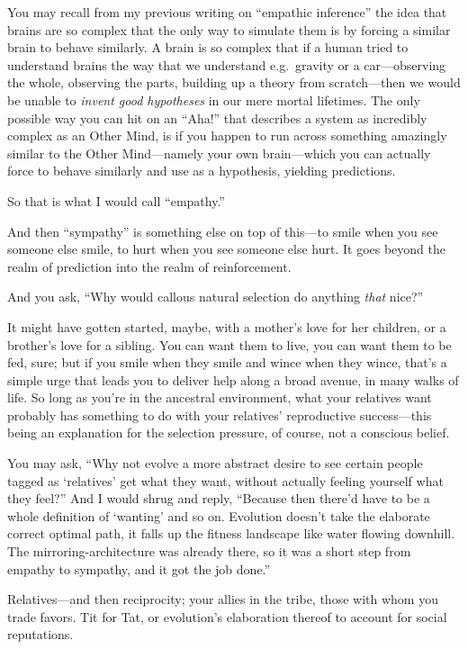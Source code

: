  You may recall from my previous writing on
``empathic inference'' the idea that
brains are so complex that the only way to simulate them is by forcing
a similar brain to behave similarly. A brain is so complex that if a
human tried to understand brains the way that we understand e.g.~gravity
or a car---observing the whole, observing the parts, building
up a theory from scratch---then we would be unable to \textit{invent
good hypotheses} in our mere mortal lifetimes. The only possible way
you can hit on an ``Aha!'' that
describes a system as incredibly complex as an Other Mind, is if you
happen to run across something amazingly similar to the Other
Mind---namely your own brain---which you can actually force to behave
similarly and use as a hypothesis, yielding predictions.


 So that is what I would call
``empathy.''


 And then ``sympathy'' is
something else on top of this---to smile when you see someone else
smile, to hurt when you see someone else hurt. It goes beyond the realm
of prediction into the realm of reinforcement.


 And you ask, ``Why would callous natural
selection do anything \textit{that} nice?''


 It might have gotten started, maybe, with a
mother's love for her children, or a
brother's love for a sibling. You can want them to
live, you can want them to be fed, sure; but if you smile when they
smile and wince when they wince, that's a simple urge
that leads you to deliver help along a broad avenue, in many walks of
life. So long as you're in the ancestral environment,
what your relatives want probably has something to do with your
relatives' reproductive success---this being an
explanation for the selection pressure, of course, not a conscious
belief.


 You may ask, ``Why not evolve a more abstract
desire to see certain people tagged as
`relatives' get what they want, without
actually feeling yourself what they feel?'' And I
would shrug and reply, ``Because then
there'd have to be a whole definition of
`wanting' and so on. Evolution
doesn't take the elaborate correct optimal path, it
falls up the fitness landscape like water flowing downhill. The
mirroring-architecture was already there, so it was a short step from
empathy to sympathy, and it got the job done.''


 Relatives---and then reciprocity; your allies in the tribe, those
with whom you trade favors. Tit for Tat, or evolution's
elaboration thereof to account for social reputations.


